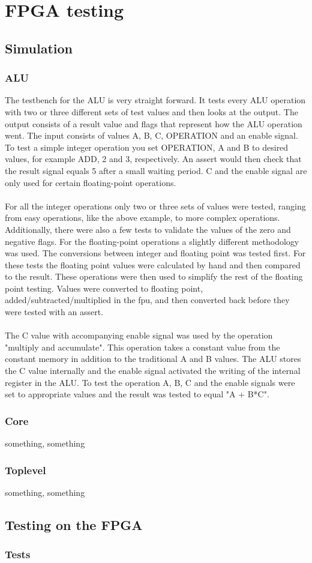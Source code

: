 \section{FPGA testing}
\subsection{Simulation}
\subsubsection{ALU}
The testbench for the ALU is very straight forward. It tests every ALU operation with two or three different sets of test values and then looks at the output. The output consists of a result value and flags that represent how the ALU operation went. The input consists of values A, B, C, OPERATION and an enable signal. To test a simple integer operation you set OPERATION, A and B to desired values, for example ADD, 2 and 3, respectively. An assert would then check that the result signal equals 5 after a small waiting period. C and the enable signal are only used for certain floating-point operations.
\\
\\
For all the integer operations only two or three sets of values were tested, ranging from easy operations, like the above example, to more complex operations. Additionally, there were also a few tests to validate the values of the zero and negative flags. For the floating-point operations a slightly different methodology was used. The conversions between integer and floating point was tested first. For these tests the floating point values were calculated by hand and then compared to the result. These operations were then used to simplify the rest of the floating point testing. Values were converted to floating point, added/subtracted/multiplied in the fpu, and then converted back before they were tested with an assert. 
\\
\\
The C value with accompanying enable signal was used by the operation "multiply and accumulate". This operation takes a constant value from the constant memory in addition to the traditional A and B values. The ALU stores the C value internally and the enable signal activated the writing of the internal register in the ALU. To test the operation A, B, C and the enable signals were set to appropriate values and the result was tested to equal "A + B*C".




\subsubsection{Core}
something, something
\subsubsection{Toplevel}
something, something
\subsection{Testing on the FPGA}\label{section:fpga-testing}

\subsubsection{Tests}





